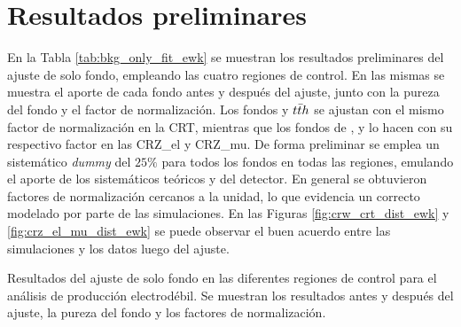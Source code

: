 \section{Resultados preliminares}


En la Tabla \ref{tab:bkg_only_fit_ewk} se muestran los resultados preliminares del ajuste de solo fondo, empleando las cuatro regiones de control. En las mismas se muestra el aporte de cada fondo antes y después del ajuste, junto con la pureza del fondo y el factor de normalización. Los fondos \ttbarph y $t\bar{t} h$ se ajustan con el mismo factor de normalización en la CRT, mientras que los fondos de \znunuph, \zeeph y \zmumuph lo hacen con su respectivo factor en las CRZ\_el y CRZ\_mu. De forma preliminar se emplea un sistemático \textit{dummy} del $25\%$ para todos los fondos en todas las regiones, emulando el aporte de los sistemáticos teóricos y del detector. En general se obtuvieron factores de normalización cercanos a la unidad, lo que evidencia un correcto modelado por parte de las simulaciones. En las Figuras \ref{fig:crw_crt_dist_ewk} y \ref{fig:crz_el_mu_dist_ewk} se puede observar el buen acuerdo entre las simulaciones y los datos luego del ajuste.

\begin{table}[ht!]
  \centering
  \caption{Resultados del ajuste de solo fondo en las diferentes regiones de control para el análisis de producción electrodébil. Se muestran los resultados antes y después del ajuste, la pureza del fondo y los factores de normalización.}
  
  \label{tab:bkg_only_fit_ewk}
\end{table}


